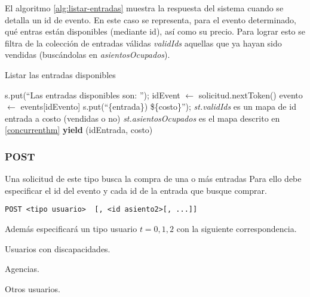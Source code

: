 El algoritmo \ref{alg:listar-entradas} muestra la respuesta del sistema cuando se detalla un id de evento.
En este caso se representa, para el evento determinado, qué entras están disponibles (mediante id),
    así como su precio.
Para lograr esto se filtra de la colección de entradas válidas \emph{validIds} aquellas que ya hayan sido
    vendidas (buscándolas en \emph{asientosOcupados}).

\begin{algorithm}
\caption{Listar las entradas disponibles}
\label{alg:listar-entradas}
\begin{algorithmic}[1]
	\State s.put(``Las entradas disponibles son: '');
	\State idEvent $\gets$ solicitud.nextToken()
	\State evento $\gets$ events[idEvento]
		\State s.put(``\{entrada\}) \$\{costo\}'');
	\EndFor
\EndProcedure
\Statex
\Require \emph{st.validIds} es un mapa de id entrada a costo (vendidas o no)
\Require \emph{st.asientosOcupados} es el mapa descrito en \ref{concurrenthm}
		\State \textbf{yield} (idEntrada, costo)
	\EndIf
	\EndFor
\EndProcedure
\end{algorithmic}
\end{algorithm}

\subsubsection{POST}
Una solicitud de este tipo busca la compra de una o más entradas
Para ello debe especificar el id del evento y cada id de la entrada que busque comprar.

\begin{center}
	\texttt{POST <tipo usuario>\ <id evento>\ <id asiento1>[, <id asiento2>[, ...]]}
\end{center}

\begin{samepage}
Además especificará un tipo usuario \(t = 0, 1, 2\) con la siguiente correspondencia.
\begin{description}[align=left,noitemsep,labelindent=\parindent]
	\item[0:] Usuarios con discapacidades.
	\item[1:] Agencias.
	\item[2:] Otros usuarios.
\end{description}
\end{samepage}

